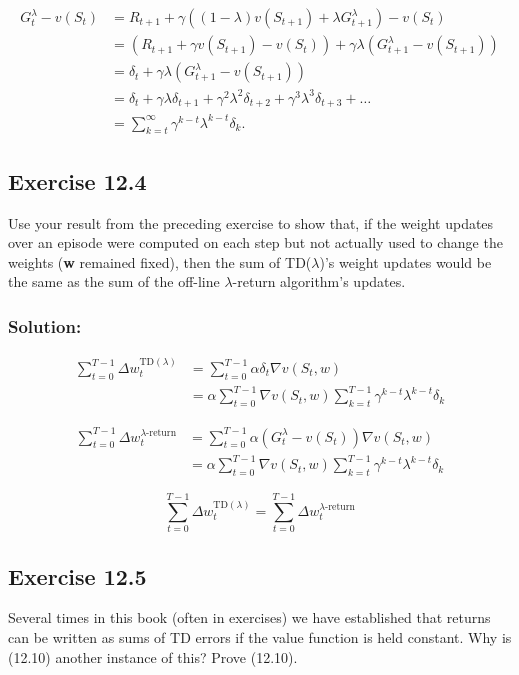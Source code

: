\begin{align*}
    G_t^\lambda - v(S_t) &= R_{t+1} + \gamma \left( (1 - \lambda) v(S_{t+1}) + \lambda G_{t+1}^\lambda \right) - v(S_t) \\
    &= \left( R_{t+1} + \gamma v(S_{t+1}) - v(S_t) \right) + \gamma \lambda \left( G_{t+1}^\lambda - v(S_{t+1}) \right) \\
    &= \delta_t + \gamma \lambda \left( G_{t+1}^\lambda - v(S_{t+1}) \right) \\
    &= \delta_t + \gamma \lambda \delta_{t+1} + \gamma^2 \lambda^2 \delta_{t+2} + \gamma^3 \lambda^3 \delta_{t+3} + \dots \\
    &= \sum_{k=t}^{\infty} \gamma^{k-t} \lambda^{k-t} \delta_k.
\end{align*}

\subsection*{Exercise 12.4}
Use your result from the preceding exercise to show that, if the weight
updates over an episode were computed on each step but not actually used to change the
weights (\textbf{w} remained fixed), then the sum of TD($\lambda$)'s weight updates would be the same
as the sum of the off-line $\lambda$-return algorithm's updates.

\subsubsection*{Solution:}

\begin{align*}
    \sum_{t=0}^{T-1} \Delta w_t^{\text{TD}(\lambda)}
    &= \sum_{t=0}^{T-1} \alpha \delta_t \nabla v(S_t, w) \\
    &= \alpha \sum_{t=0}^{T-1} \nabla v(S_t, w) \sum_{k=t}^{T-1} \gamma^{k-t} \lambda^{k-t} \delta_k 
\end{align*}


\begin{align*}
    \sum_{t=0}^{T-1} \Delta w_t^{\lambda\text{-return}}
    &= \sum_{t=0}^{T-1} \alpha (G_t^\lambda - v(S_t)) \nabla v(S_t, w) \\
    &= \alpha \sum_{t=0}^{T-1} \nabla v(S_t, w) \sum_{k=t}^{T-1} \gamma^{k-t} \lambda^{k-t} \delta_k
\end{align*}


\[
    \sum_{t=0}^{T-1} \Delta w_t^{\text{TD}(\lambda)} = \sum_{t=0}^{T-1} \Delta w_t^{\lambda\text{-return}}
\]

\subsection*{Exercise 12.5}
Several times in this book (often in exercises) we have established that
returns can be written as sums of TD errors if the value function is held constant. Why
is (12.10) another instance of this? Prove (12.10).


